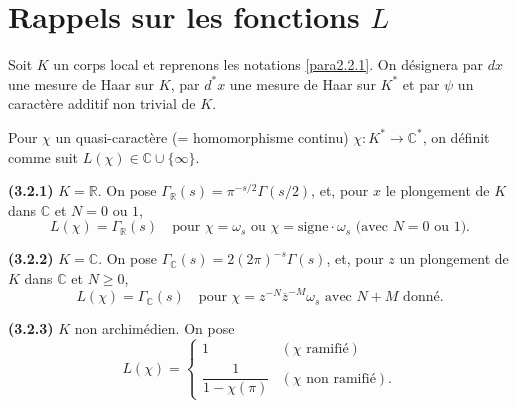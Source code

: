 \documentclass[11pt,a4paper]{amsart}
\theoremstyle{plain}
\theoremstyle{definition}
\newcommand{\dbR}{\mathbb{R}}
\newcommand{\dbC}{\mathbb{C}}
\newenvironment{para}{\par\noindent}{\par}
\newcommand{\ov}[1]{\overline{#1}}
\begin{document}
\section{Rappels sur les fonctions $L$}\label{sec3}

\begin{para}
Soit $K$ un corps local et reprenons les notations \ref{para2.2.1}. On d\'esignera par $dx$ une mesure de Haar sur $K$, par $d^{*}x$ une mesure de Haar sur $K^{*}$ et par $\psi$ un caract\`ere additif non trivial de $K$.
\end{para}

\begin{para}
Pour $\chi$ un quasi-caract\`ere (= homomorphisme continu) $\chi: K^{*} \to \dbC^{*}$, on d\'efinit comme suit $L(\chi) \in \dbC \cup \{\infty\}$.
\end{para}

\begin{para}
\textbf{(3.2.1)} $K = \dbR$. On pose $\Gamma_{\dbR}(s) = \pi^{-s/2} \Gamma(s/2)$, et, pour $x$ le plongement de $K$ dans $\dbC$ et $N = 0$ ou $1$,
\[
L(\chi) = \Gamma_{\dbR}(s) \quad \text{pour } \chi = \omega_{s} \text{ ou } \chi = \text{signe} \cdot \omega_{s} \text{ (avec } N = 0 \text{ ou } 1).
\]
\end{para}

\begin{para}
\textbf{(3.2.2)} $K = \dbC$. On pose $\Gamma_{\dbC}(s) = 2(2\pi)^{-s} \Gamma(s)$, et, pour $z$ un plongement de $K$ dans $\dbC$ et $N \geq 0$,
\[
L(\chi) = \Gamma_{\dbC}(s) \quad \text{pour } \chi = z^{-N} \ov{z}^{-M} \omega_{s} \text{ avec } N+M \text{ donn\'e}.
\]
\end{para}

\begin{para}
\textbf{(3.2.3)} $K$ non archim\'edien. On pose
\[
L(\chi) = \begin{cases}
1 & (\chi \text{ ramifi\'e}) \\
\dfrac{1}{1 - \chi(\pi)} & (\chi \text{ non ramifi\'e}).
\end{cases}
\]
\end{para}
\end{document}
